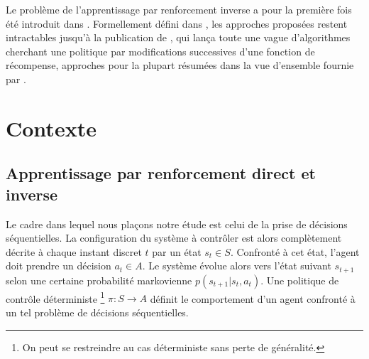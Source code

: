 \documentclass[publibook-draft]{CAp2012}
\begin{document}
Le problème de l'apprentissage par renforcement inverse a pour la première fois été introduit dans \cite{russell1998learning}. Formellement défini dans \cite{ng2000algorithms}, les approches proposées restent intractables jusqu'à la publication de \cite{abbeel2004apprenticeship}, qui lança toute une vague d'algorithmes cherchant une politique par modifications successives d'une fonction de récompense, approches pour la plupart résumées dans la vue d'ensemble fournie par \cite{neu2009training}.
\section{Contexte}
\label{back.sec}
\subsection{Apprentissage par renforcement direct et inverse}
Le cadre dans lequel nous plaçons notre étude est celui de la prise de décisions séquentielles. La configuration du système à contrôler est alors complètement décrite à chaque instant discret $t$ par un état $s_t \in S$. Confronté à cet état, l'agent doit prendre un décision $a_t\in A$. Le système évolue alors vers l'état suivant $s_{t+1}$ selon une certaine probabilité markovienne $p(s_{t+1}|s_t, a_t)$. Une politique de contrôle déterministe \footnote{On peut se restreindre au cas déterministe sans perte de généralité.} $\pi : S\rightarrow A$ définit le comportement d'un agent confronté à un tel problème de décisions séquentielles.\\
\end{document}

